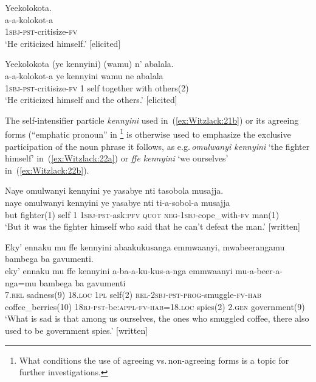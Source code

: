 \documentclass[output=paper,colorlinks,citecolor=brown,
]{langscibook}
\begin{document}
\ea\label{ex:Witzlack:21}

\ea \label{ex:Witzlack:21a}
    \glll Yeekolokota.\\
    a-a-kolokot-a\\
    \textsc{1sbj}-\textsc{pst}-critisize-\textsc{fv}\\
    \glt ‘He criticized himself.’ [elicited]

\ex \label{ex:Witzlack:21b}
    \glll Yeekolokota (ye kennyini) (wamu) n’ abalala.\\
    a-a-kolokot-a	ye	kennyini	wamu	ne	abalala\\
    \textsc{1sbj}-\textsc{pst}-critisize-\textsc{fv}	1	self		together	with		others(2)\\
    \glt ‘He criticized himself and the others.’ [elicited]

\z
\z

The self-intensifier particle \emph{kennyini} used in~(\ref{ex:Witzlack:21b}) or its agreeing forms (“emphatic pronoun” in \citet[178, 439]{Murphy1972}\footnote{What conditions the use of agreeing vs.\,non-agreeing forms is a topic for further investigations.} is otherwise used to emphasize the exclusive participation of the noun phrase it follows, as e.g.\,\emph{omulwanyi kennyini} ‘the fighter himself’ in~(\ref{ex:Witzlack:22a}) or \emph{ffe kennyini} ‘we ourselves’ in~(\ref{ex:Witzlack:22b}).

\ea\label{ex:Witzlack:22}

\ea \label{ex:Witzlack:22a}
    \glll Naye omulwanyi kennyini ye yasabye nti tasobola musajja.\\
    naye omulwanyi	kennyini	ye	yasabye	nti	ti-a-sobol-a			musajja \\
    but	fighter(1)	self 1 \textsc{1sbj}-\textsc{pst}-ask:\textsc{pfv} \textsc{quot} \textsc{neg}-\textsc{1sbj}-cope\_with-\textsc{fv}	man(1)\\
    \glt ‘But it was the fighter himself who said that he can’t defeat the man.’ [written]%

\ex \label{ex:Witzlack:22b}
    \glll Eky’ ennaku mu ffe kennyini abaakukusanga emmwaanyi, mwabeerangamu bambega ba 	gavumenti.\\
    eky’ ennaku	mu	ffe	kennyini a-ba-a-ku-kus-a-nga emmwaanyi		mu-a-beer-a-nga=mu 	bambega	ba gavumenti\\
    \textsc{7.rel}	sadness(9)	\textsc{18.loc}	\textsc{1pl}	self(2)	\textsc{rel-2sbj}-\textsc{pst-prog}-smuggle-\textsc{fv-hab} coffee\_berries(10)	\textsc{18bj}-\textsc{pst}-be:\textsc{appl}-\textsc{fv-hab=18.loc}	spies(2) \textsc{2.gen}	government(9)\\
    \glt ‘What is sad is that among us ourselves, the ones who smuggled coffee, there also used to be government spies.’ [written] %
\end{document}
